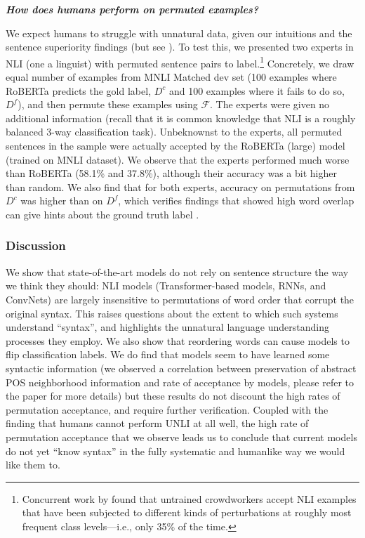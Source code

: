 \documentclass[12pt]{article}
\newcommand{\xit}[1]{{\noindent\textbf{\textit{#1}}}}
\begin{document}
\xit{How does humans perform on permuted examples?}

We expect humans to struggle with unnatural data, given our intuitions and the sentence superiority findings (but see \citealt{mollica-2020-composition}). To test this, we presented two experts in NLI (one a linguist) with permuted sentence pairs to label.\footnote{Concurrent work by  found that untrained crowdworkers accept NLI examples that have been subjected to different kinds of perturbations at roughly most frequent class levels---i.e., only 35\% of the time.} Concretely, we draw equal number of examples from MNLI Matched dev set (100 examples where RoBERTa predicts the gold label, $D^c$ and 100 examples where it fails to do so, $D^f$), and then permute these examples using $\mathcal{F}$. The experts were given no additional information (recall that it is common knowledge that NLI is a roughly balanced 3-way classification task). Unbeknownst to the experts, all permuted sentences in the sample were actually accepted by the RoBERTa (large) model (trained on MNLI dataset). We observe that the experts performed much worse than RoBERTa (58.1\% and 37.8\%), although their accuracy was a bit higher than random. We also find that for both experts, accuracy on permutations from $D^c$ was higher than on $D^f$, which verifies findings that showed high word overlap can give hints about the ground truth label \citep{dasgupta-etal-2018-evaluating, poliak-etal-2018-hypothesis, gururangan-etal-2018-annotation, naik-etal-2019-exploring}.


\subsubsection{Discussion}

We show that state-of-the-art models do not rely on sentence structure the way we think they should: NLI models (Transformer-based models, RNNs, and ConvNets) are largely insensitive to permutations of word order that corrupt the original syntax. This raises questions about the extent to which such systems understand ``syntax'', and highlights the unnatural language understanding processes they employ.
We also show that reordering words can cause models to flip classification labels. %
We do find that models seem to have learned some syntactic information (we observed a correlation between preservation of abstract POS neighborhood information and rate of acceptance by models, please refer to the paper for more details) but these results do not discount the high rates of permutation acceptance, and require further verification. Coupled with the finding that humans cannot perform UNLI at all well, the high rate of permutation acceptance that we observe leads us to conclude that current models do not yet ``know syntax'' in the fully systematic and humanlike way we would like them to.
\end{document}
